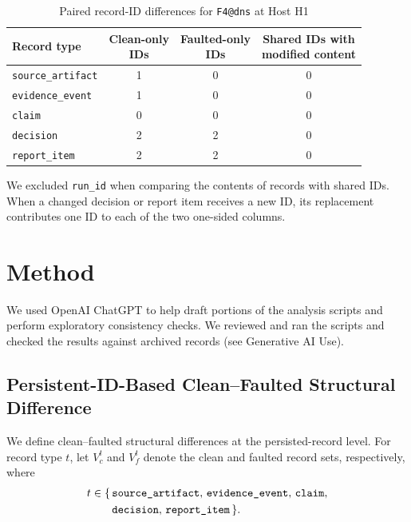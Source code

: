 \documentclass[sn-basic]{sn-jnl}%
\theoremstyle{thmstyleone}%
\theoremstyle{thmstyletwo}%
\theoremstyle{thmstylethree}%
\begin{document}
\begin{table}[htbp]
\centering
\caption{Paired record-ID differences for \texttt{F4@dns} at Host H1}
\label{tab:f4-dns-h1}
\begin{tabular*}{\linewidth}{@{\extracolsep{\fill}}lccc@{}}
\toprule
\textbf{Record type} &
\shortstack{\textbf{Clean-only}\\\textbf{IDs}} &
\shortstack{\textbf{Faulted-only}\\\textbf{IDs}} &
\shortstack{\textbf{Shared IDs with}\\\textbf{modified content}} \\
\midrule
\texttt{source\_artifact} & 1 & 0 & 0 \\
\texttt{evidence\_event}  & 1 & 0 & 0 \\
\texttt{claim}            & 0 & 0 & 0 \\
\texttt{decision}         & 2 & 2 & 0 \\
\texttt{report\_item}     & 2 & 2 & 0 \\
\bottomrule
\end{tabular*}
\end{table}

We excluded \texttt{run\_id} when comparing the contents of records with shared IDs. When a changed decision or report item receives a new ID, its replacement contributes one ID to each of the two one-sided columns.

\section{Method}\label{sec:method}

We used OpenAI ChatGPT to help draft portions of the analysis scripts and perform exploratory consistency checks. We reviewed and ran the scripts and checked the results against archived records (see Generative AI Use).

\subsection{Persistent-ID-Based Clean--Faulted Structural Difference}
\label{sec:structural-difference}

We define clean--faulted structural differences at the persisted-record level. For record type \(t\), let \(V_c^t\) and \(V_f^t\) denote the clean and faulted record sets, respectively, where
\[
\begin{aligned}
t \in \{\, &\text{\texttt{source\_artifact}},\,
            \text{\texttt{evidence\_event}},\,
            \text{\texttt{claim}}, \\
          &\text{\texttt{decision}},\,
            \text{\texttt{report\_item}} \,\}.
\end{aligned}
\]
\end{document}

